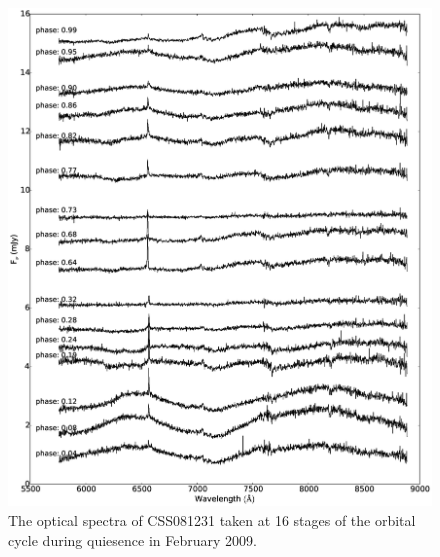 \documentclass[a4paper,fleqn,usenatbib]{mnras}
\begin{document}
\begin{figure}
\centering
\includegraphics[width=\textwidth]{images/CSS081231_spectra_q.eps}
\caption[Caption for spectra]{The optical spectra of CSS081231 taken at 16 stages of the orbital cycle during quiesence in February 2009.  }
\label{fig:spectra-quiescent}
\end{figure}
\end{document}
